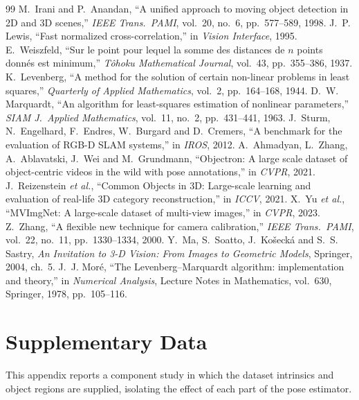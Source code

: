 \documentclass[journal]{IEEEtran}
\begin{document}
\begin{thebibliography}{99}
 M.~Irani and P.~Anandan, ``A unified approach to moving object detection in 2D and 3D scenes,'' \emph{IEEE Trans.\ PAMI}, vol.~20, no.~6, pp.~577--589, 1998.
 J.~P. Lewis, ``Fast normalized cross-correlation,'' in \emph{Vision Interface}, 1995.
 E.~Weiszfeld, ``Sur le point pour lequel la somme des distances de $n$ points donn\'es est minimum,'' \emph{T\^ohoku Mathematical Journal}, vol.~43, pp.~355--386, 1937.
 K.~Levenberg, ``A method for the solution of certain non-linear problems in least squares,'' \emph{Quarterly of Applied Mathematics}, vol.~2, pp.~164--168, 1944.
 D.~W. Marquardt, ``An algorithm for least-squares estimation of nonlinear parameters,'' \emph{SIAM J.\ Applied Mathematics}, vol.~11, no.~2, pp.~431--441, 1963.
 J.~Sturm, N.~Engelhard, F.~Endres, W.~Burgard and D.~Cremers, ``A benchmark for the evaluation of RGB-D SLAM systems,'' in \emph{IROS}, 2012.
 A.~Ahmadyan, L.~Zhang, A.~Ablavatski, J.~Wei and M.~Grundmann, ``Objectron: A large scale dataset of object-centric videos in the wild with pose annotations,'' in \emph{CVPR}, 2021.
 J.~Reizenstein \emph{et al.}, ``Common Objects in 3D: Large-scale learning and evaluation of real-life 3D category reconstruction,'' in \emph{ICCV}, 2021.
 X.~Yu \emph{et al.}, ``MVImgNet: A large-scale dataset of multi-view images,'' in \emph{CVPR}, 2023.
 Z.~Zhang, ``A flexible new technique for camera calibration,'' \emph{IEEE Trans.\ PAMI}, vol.~22, no.~11, pp.~1330--1334, 2000.
 Y.~Ma, S.~Soatto, J.~Ko\v{s}eck\'a and S.~S. Sastry, \emph{An Invitation to 3-D Vision: From Images to Geometric Models}, Springer, 2004, ch.~5.
 J.~J. Mor\'e, ``The Levenberg--Marquardt algorithm: implementation and theory,'' in \emph{Numerical Analysis}, Lecture Notes in Mathematics, vol.~630, Springer, 1978, pp.~105--116.
\end{thebibliography}

\appendices
\section{Supplementary Data}

This appendix reports a component study in which the dataset intrinsics and object regions are supplied, isolating the effect of each part of the pose estimator.
\end{document}
